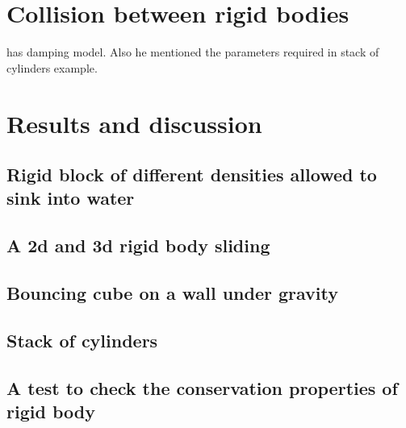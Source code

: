 \documentclass[preprint,12pt]{elsarticle}
\newcommand{\todoin}{\todo[inline]}
\begin{document}
\section{Collision between rigid bodies}
\label{sec:contact-force}

\citet{chen2019coupled} has damping model. Also he mentioned the parameters
required in stack of cylinders example.





\section{Results and discussion}
\label{sec:results}

\subsection{Rigid block of different densities allowed to sink into water}
\label{sec:rigid-block-diff}


\subsection{A 2d and 3d rigid body sliding}
\label{sec:rigid-body-sliding}


\subsection{Bouncing cube on a wall under gravity}
\label{sec:bouncing-cube}


\subsection{Stack of cylinders}
\label{sec:stack-of-cylinders}


\subsection{A test to check the conservation properties of rigid body}
\label{sec:conservation-of-rb-properties}
\end{document}
